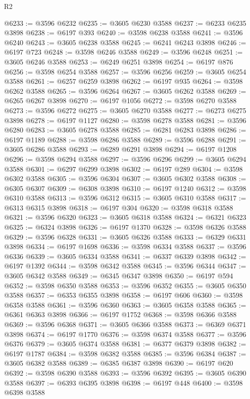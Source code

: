 \begin{lexlean}{R2}
\begin{coremodule}
@6233 := @3596 @6232
@6235 := @3605 @6230 @3588
@6237 := @6233 @6235 @3898
@6238 := @6197 @393
@6240 := @3598 @6238 @3588
@6241 := @3596 @6240
@6243 := @3605 @6238 @3588
@6245 := @6241 @6243 @3898
@6246 := @6197 @723
@6248 := @3598 @6246 @3588
@6249 := @3596 @6248
@6251 := @3605 @6246 @3588
@6253 := @6249 @6251 @3898
@6254 := @6197 @876
@6256 := @3598 @6254 @3588
@6257 := @3596 @6256
@6259 := @3605 @6254 @3588
@6261 := @6257 @6259 @3898
@6262 := @6197 @935
@6264 := @3598 @6262 @3588
@6265 := @3596 @6264
@6267 := @3605 @6262 @3588
@6269 := @6265 @6267 @3898
@6270 := @6197 @1056
@6272 := @3598 @6270 @3588
@6273 := @3596 @6272
@6275 := @3605 @6270 @3588
@6277 := @6273 @6275 @3898
@6278 := @6197 @1127
@6280 := @3598 @6278 @3588
@6281 := @3596 @6280
@6283 := @3605 @6278 @3588
@6285 := @6281 @6283 @3898
@6286 := @6197 @1189
@6288 := @3598 @6286 @3588
@6289 := @3596 @6288
@6291 := @3605 @6286 @3588
@6293 := @6289 @6291 @3898
@6294 := @6197 @1208
@6296 := @3598 @6294 @3588
@6297 := @3596 @6296
@6299 := @3605 @6294 @3588
@6301 := @6297 @6299 @3898
@6302 := @6197 @289
@6304 := @3598 @6302 @3588
@6305 := @3596 @6304
@6307 := @3605 @6302 @3588
@6308 := @6305 @6307
@6309 := @6308 @3898
@6310 := @6197 @1240
@6312 := @3598 @6310 @3588
@6313 := @3596 @6312
@6315 := @3605 @6310 @3588
@6317 := @6313 @6315 @3898
@6318 := @6197 @304
@6320 := @3598 @6318 @3588
@6321 := @3596 @6320
@6323 := @3605 @6318 @3588
@6324 := @6321 @6323
@6325 := @6324 @3898
@6326 := @6197 @1370
@6328 := @3598 @6326 @3588
@6329 := @3596 @6328
@6331 := @3605 @6326 @3588
@6333 := @6329 @6331 @3898
@6334 := @6197 @1698
@6336 := @3598 @6334 @3588
@6337 := @3596 @6336
@6339 := @3605 @6334 @3588
@6341 := @6337 @6339 @3898
@6342 := @6197 @1392
@6344 := @3598 @6342 @3588
@6345 := @3596 @6344
@6347 := @3605 @6342 @3588
@6349 := @6345 @6347 @3898
@6350 := @6197 @594
@6352 := @3598 @6350 @3588
@6353 := @3596 @6352
@6355 := @3605 @6350 @3588
@6357 := @6353 @6355 @3898
@6358 := @6197 @606
@6360 := @3598 @6358 @3588
@6361 := @3596 @6360
@6363 := @3605 @6358 @3588
@6365 := @6361 @6363 @3898
@6366 := @6197 @1752
@6368 := @3598 @6366 @3588
@6369 := @3596 @6368
@6371 := @3605 @6366 @3588
@6373 := @6369 @6371 @3898
@6374 := @6197 @1770
@6376 := @3598 @6374 @3588
@6377 := @3596 @6376
@6379 := @3605 @6374 @3588
@6381 := @6377 @6379 @3898
@6382 := @6197 @1787
@6384 := @3598 @6382 @3588
@6385 := @3596 @6384
@6387 := @3605 @6382 @3588
@6389 := @6385 @6387 @3898
@6390 := @6197 @620
@6392 := @3598 @6390 @3588
@6393 := @3596 @6392
@6395 := @3605 @6390 @3588
@6397 := @6393 @6395 @3898
@6398 := @6197 @448
@6400 := @3598 @6398 @3588

\end{coremodule}
\end{lexlean}
